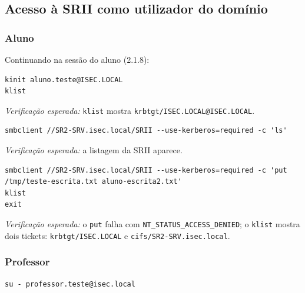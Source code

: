 
\subsection[Acesso à SRII como utilizador do domínio]{Acesso à SRII como utilizador do domínio}

\subsubsection[Aluno]{Aluno}


Continuando na sessão do aluno (2.1.8):

\begin{lstlisting}[style=bashstyle]
kinit aluno.teste@ISEC.LOCAL
klist
\end{lstlisting}

\emph{Verificação esperada:} \texttt{klist} mostra \texttt{krbtgt/\allowbreak{}ISEC.LOCAL@ISEC.LOCAL}.


\begin{lstlisting}[style=bashstyle]
smbclient //SR2-SRV.isec.local/SRII --use-kerberos=required -c 'ls'
\end{lstlisting}

\emph{Verificação esperada:} a listagem da SRII aparece.


\begin{lstlisting}[style=bashstyle]
smbclient //SR2-SRV.isec.local/SRII --use-kerberos=required -c 'put /tmp/teste-escrita.txt aluno-escrita2.txt'
klist
exit
\end{lstlisting}

\emph{Verificação esperada:} o \texttt{put} falha com \texttt{NT\_STATUS\_ACCESS\_DENIED}; o \texttt{klist} mostra dois tickets: \texttt{krbtgt/\allowbreak{}ISEC.LOCAL} e \texttt{cifs/\allowbreak{}SR2-SRV.isec.local}.

\subsubsection[Professor]{Professor}


\begin{lstlisting}[style=bashstyle]
su - professor.teste@isec.local
\end{lstlisting}

